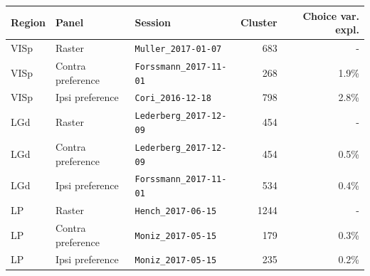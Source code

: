 \begin{tabular}{@{}llp{5.2cm}rr@{}}
\toprule
Region & Panel & Session & Cluster & Choice var. expl. \\
\midrule
VISp & Raster & \texttt{Muller\_2017-01-07} & 683 & - \\
VISp & Contra preference & \texttt{Forssmann\_2017-11-01} & 268 & 1.9\% \\
VISp & Ipsi preference & \texttt{Cori\_2016-12-18} & 798 & 2.8\% \\
LGd & Raster & \texttt{Lederberg\_2017-12-09} & 454 & - \\
LGd & Contra preference & \texttt{Lederberg\_2017-12-09} & 454 & 0.5\% \\
LGd & Ipsi preference & \texttt{Forssmann\_2017-11-01} & 534 & 0.4\% \\
LP & Raster & \texttt{Hench\_2017-06-15} & 1244 & - \\
LP & Contra preference & \texttt{Moniz\_2017-05-15} & 179 & 0.3\% \\
LP & Ipsi preference & \texttt{Moniz\_2017-05-15} & 235 & 0.2\% \\
\bottomrule
\end{tabular}
